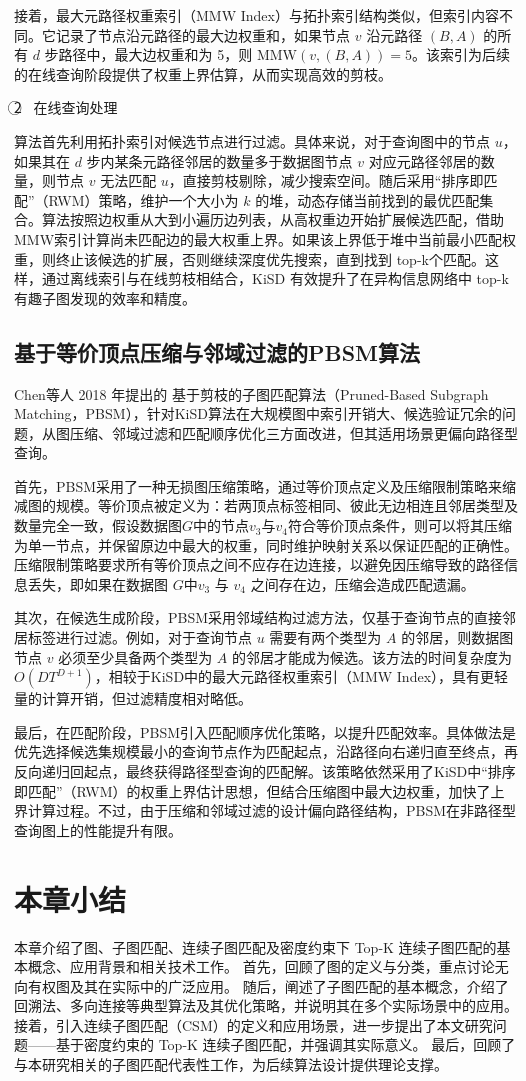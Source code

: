 接着，最大元路径权重索引（MMW Index）与拓扑索引结构类似，但索引内容不同。它记录了节点沿元路径的最大边权重和，如果节点 $v$ 沿元路径 $(B,A)$ 的所有 $d$ 步路径中，最大边权重和为 5，则 MMW$(v, (B,A))=5$。该索引为后续的在线查询阶段提供了权重上界估算，从而实现高效的剪枝。

\textcircled{2}~ 在线查询处理

算法首先利用拓扑索引对候选节点进行过滤。具体来说，对于查询图中的节点 $u$，如果其在 $d$ 步内某条元路径邻居的数量多于数据图节点 $v$ 对应元路径邻居的数量，则节点 $v$ 无法匹配 $u$，直接剪枝剔除，减少搜索空间。随后采用“排序即匹配”（RWM）策略，维护一个大小为 $k$ 的堆，动态存储当前找到的最优匹配集合。算法按照边权重从大到小遍历边列表，从高权重边开始扩展候选匹配，借助MMW索引计算尚未匹配边的最大权重上界。如果该上界低于堆中当前最小匹配权重，则终止该候选的扩展，否则继续深度优先搜索，直到找到 top-k个匹配。这样，通过离线索引与在线剪枝相结合，KiSD 有效提升了在异构信息网络中 top-k有趣子图发现的效率和精度。

\subsection{基于等价顶点压缩与邻域过滤的PBSM算法}
Chen\cite{static-topk-Chen-DBLP:journals/ijprai/ChenLCTL18}等人 2018 年提出的 基于剪枝的子图匹配算法（Pruned-Based Subgraph Matching，PBSM），针对KiSD算法在大规模图中索引开销大、候选验证冗余的问题，从图压缩、邻域过滤和匹配顺序优化三方面改进，但其适用场景更偏向路径型查询。

首先，PBSM采用了一种无损图压缩策略，通过等价顶点定义及压缩限制策略来缩减图的规模。等价顶点被定义为：若两顶点标签相同、彼此无边相连且邻居类型及数量完全一致，假设数据图$G$中的节点$v_3$与$v_4$符合等价顶点条件，则可以将其压缩为单一节点，并保留原边中最大的权重，同时维护映射关系以保证匹配的正确性。压缩限制策略要求所有等价顶点之间不应存在边连接，以避免因压缩导致的路径信息丢失，即如果在数据图 $G$中$v_3$ 与 $v_4$ 之间存在边，压缩会造成匹配遗漏。

其次，在候选生成阶段，PBSM采用邻域结构过滤方法，仅基于查询节点的直接邻居标签进行过滤。例如，对于查询节点 $u$ 需要有两个类型为 $A$ 的邻居，则数据图节点 $v$ 必须至少具备两个类型为 $A$ 的邻居才能成为候选。该方法的时间复杂度为 $O(DT^{D+1})$，相较于KiSD中的最大元路径权重索引（MMW Index），具有更轻量的计算开销，但过滤精度相对略低。

最后，在匹配阶段，PBSM引入匹配顺序优化策略，以提升匹配效率。具体做法是优先选择候选集规模最小的查询节点作为匹配起点，沿路径向右递归直至终点，再反向递归回起点，最终获得路径型查询的匹配解。该策略依然采用了KiSD中“排序即匹配”（RWM）的权重上界估计思想，但结合压缩图中最大边权重，加快了上界计算过程。不过，由于压缩和邻域过滤的设计偏向路径结构，PBSM在非路径型查询图上的性能提升有限。



\section{本章小结}
本章介绍了图、子图匹配、连续子图匹配及密度约束下 Top-K 连续子图匹配的基本概念、应用背景和相关技术工作。
首先，回顾了图的定义与分类，重点讨论无向有权图及其在实际中的广泛应用。
随后，阐述了子图匹配的基本概念，介绍了回溯法、多向连接等典型算法及其优化策略，并说明其在多个实际场景中的应用。接着，引入连续子图匹配（CSM）的定义和应用场景，进一步提出了本文研究问题——基于密度约束的 Top-K 连续子图匹配，并强调其实际意义。
最后，回顾了与本研究相关的子图匹配代表性工作，为后续算法设计提供理论支撑。

